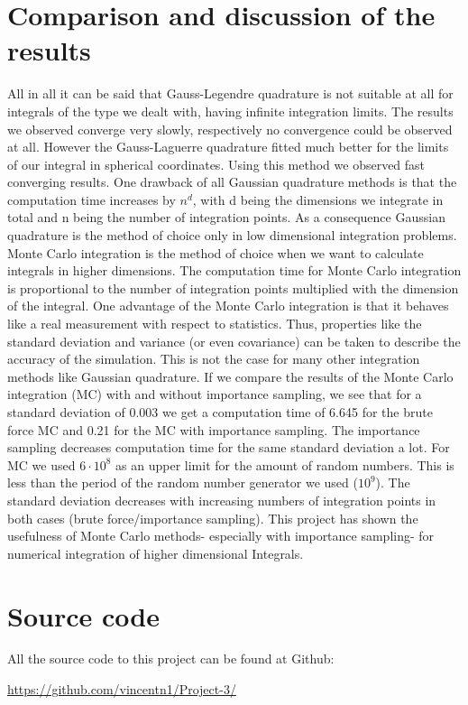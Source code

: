 \documentclass[10pt,a4paper]{article}
\begin{document}
\newpage

\section{Comparison and discussion of the results}

All in all it can be said that Gauss-Legendre quadrature is not suitable at all for integrals of the type we dealt with, having infinite integration limits. The results we observed converge very slowly, respectively no convergence could be observed at all. However the Gauss-Laguerre quadrature fitted much better for the limits of our integral in spherical coordinates. Using this method we observed fast converging results. One drawback of all Gaussian quadrature methods is that the computation time increases by $n^d$, with d being the dimensions we integrate in total and n being the number of integration points. As a consequence Gaussian quadrature is the method of choice only in low dimensional integration problems.
Monte Carlo integration is the method of choice when we want to calculate integrals in higher dimensions. The computation time for Monte Carlo integration is proportional to the number of integration points multiplied with the dimension of the integral. One advantage of the Monte Carlo integration is that it behaves like a real measurement with respect to statistics. Thus, properties like the standard deviation and variance (or even covariance) can be taken to describe the accuracy of the simulation. This is not the case for many other integration methods like Gaussian quadrature. If we compare the results of the Monte Carlo integration (MC) with and without importance sampling, we see that for a standard deviation of 0.003 we get a computation time of 6.645 for the brute force MC and 0.21 for the MC with importance sampling. The importance sampling decreases computation time for the same standard deviation a lot. For MC we used $6 \cdot 10^{8}$ as an upper limit for the amount of random numbers. This is less than the period of the random number generator we used ($10^{9}$). The standard deviation decreases with increasing numbers of integration points in both cases (brute force/importance sampling). This project has shown the usefulness of Monte Carlo methods- especially with importance sampling- for numerical integration of higher dimensional Integrals. 



\section{Source code}

All the source code to this project can be found at Github:

\url{https://github.com/vincentn1/Project-3/}
\end{document}
